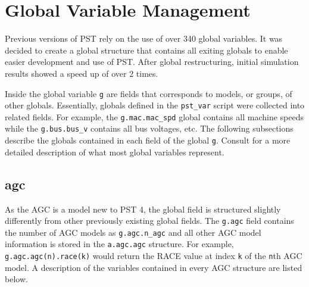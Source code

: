 \pagebreak
\section{Global Variable Management}  
Previous versions of PST rely on the use of over 340 global variables.
It was decided to create a global structure that contains all exiting globals to enable easier development and use of PST.
After global restructuring, initial simulation results showed a speed up of over 2 times.


Inside the global variable \verb|g| are fields that corresponds to models, or groups, of other globals.
Essentially, globals defined in the \verb|pst_var| script were collected into related fields.
For example, the \verb|g.mac.mac_spd| global contains all machine speeds while the \verb|g.bus.bus_v| contains all bus voltages, etc.
The following subsections describe the globals contained in each field of the global \verb|g|. 
Consult \cite{PST3manual} for a more detailed description of what most global variables represent.


\subsection{agc}  
As the AGC is a model new to PST 4, the global field is structured slightly differently from other previously existing global fields.
The \verb|g.agc| field contains the number of AGC models as \verb|g.agc.n_agc| and all other AGC model information is stored in the \verb|a.agc.agc| structure.
For example, \verb|g.agc.agc(n).race(k)| would return the RACE value at index \verb|k| of the \verb|n|th AGC model.
A description of the variables contained in every AGC structure are listed below.

